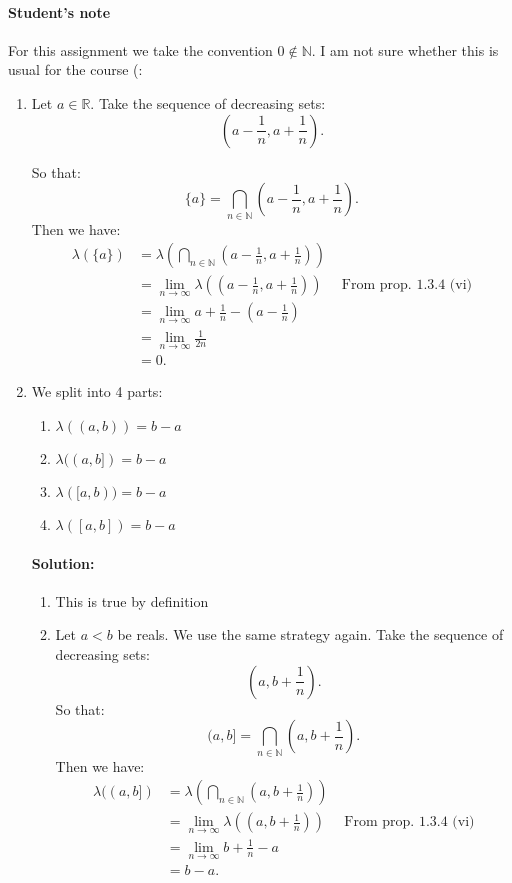 \documentclass{article}
\begin{document}
\paragraph{Student's note} For this assignment we take the convention $0\not\in \mathbb{N}.$ I am not sure whether this is usual for the course (:
\begin{enumerate}
    \item Let $a\in \mathbb{R}$. Take the sequence of decreasing sets:
        \[
        \left(a-\frac{1}{n},a+\frac{1}{n}\right)
        .\] 

        So that:
        \[
            \{a\} =\bigcap_{n\in \mathbb{N}} \left(a-\frac{1}{n},a+\frac{1}{n}\right)
        .\] 
        Then we have:
        \begin{align*}
        \lambda(\{a\}) &=\lambda\left( \bigcap_{n\in \mathbb{N}}  \left(a-\frac{1}{n},a+\frac{1}{n}\right) \right)\\
        &= \lim_{n \to \infty} \lambda\left( \left( a-\frac{1}{n},a+\frac{1}{n} \right) \right) &\text{ From prop. 1.3.4 (vi)}\\
        &= \lim_{n \to \infty} a+\frac{1}{n}-\left( a-\frac{1}{n} \right)  \\
        &= \lim_{n \to \infty} \frac{1}{2n} \\
        &= 0
        .\end{align*}
    \item 
        We split into 4 parts:
        \begin{enumerate}[label= (\alph*)] 
            \item $\lambda((a,b))=b-a$
            \item $\lambda((a,b])=b-a$
            \item $\lambda([a,b))=b-a$
            \item $\lambda([a,b])=b-a$
        \end{enumerate}
        \paragraph{Solution:} 
        \begin{enumerate}[label= (\alph*)] 
            \item This is true by definition
            \item Let $a<b$ be reals. We use the same strategy again. Take the sequence of decreasing sets:
        \[
        \left(a,b+\frac{1}{n}\right)
        .\] 
        So that:
        \[
            (a,b] =\bigcap_{n\in \mathbb{N}} \left(a,b+\frac{1}{n}\right)
        .\] 
        Then we have:
        \begin{align*}
            \lambda((a,b])&=\lambda\left( \bigcap_{n\in \mathbb{N}} \left(a,b+\frac{1}{n}\right) \right) \\
            &= \lim_{n \to \infty} \lambda\left( \left( a,b+\frac{1}{n} \right)  \right)  &\text{ From prop. 1.3.4 (vi)}\\
            &= \lim_{n \to \infty} b+\frac{1}{n}-a \\
            &= b-a
        .\end{align*}


\end{enumerate}
\end{enumerate}
\end{document}

